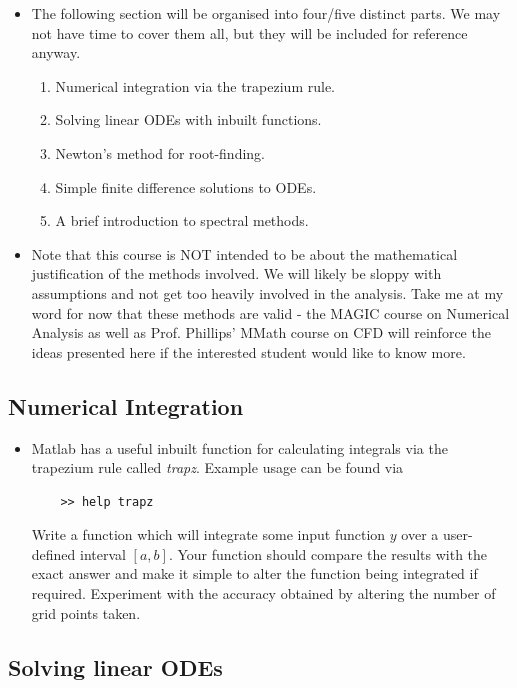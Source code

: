\documentclass[12pt]{report}
\begin{document}
\begin{itemize}
	\item The following section will be organised into four/five distinct parts. We may not have time to cover them all, but they will be included for reference anyway.
	\begin{enumerate}
		\item Numerical integration via the trapezium rule.
		\item Solving linear ODEs with inbuilt functions.
		\item Newton's method for root-finding.
		\item Simple finite difference solutions to ODEs.
		\item A brief introduction to spectral methods.
	\end{enumerate}
	\item Note that this course is NOT intended to be about the mathematical justification of the methods involved. We will likely be sloppy with assumptions and not get too heavily involved in the analysis. Take me at my word for now that these methods are valid - the MAGIC course on Numerical Analysis as well as Prof. Phillips' MMath course on CFD will reinforce the ideas presented here if the interested student would like to know more.
\end{itemize}

\subsection*{Numerical Integration}

\begin{itemize}
	\item Matlab has a useful inbuilt function for calculating integrals via the trapezium rule called \textit{trapz}. Example usage can be found via
	\begin{lstlisting}
	>> help trapz
	\end{lstlisting}
	\begin{tcolorbox}[title=Task]
		Write a function which will integrate some input function $y$ over a user-defined interval $[a,b]$. Your function should compare the results with the exact answer and make it simple to alter the function being integrated if required. 
		\tcblower
		Experiment with the accuracy obtained by altering the number of grid points taken.
	\end{tcolorbox}
\end{itemize}

\subsection*{Solving linear ODEs}
\end{document}
